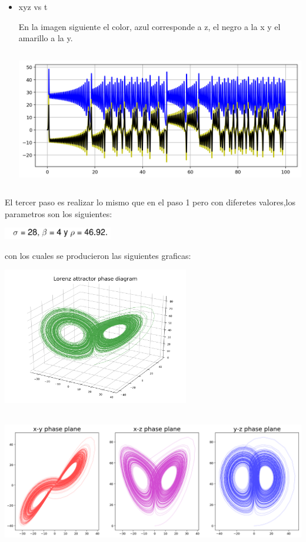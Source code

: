 \documentclass{article}
\begin{document}
\begin{itemize}
\item xyz vs t

En la imagen siguiente el color, azul corresponde a z, el negro a la x y el amarillo a la y.

\begin{center}
\includegraphics[height=6cm]{xyz_t.png}
\end{center}

\end{itemize}

\vspace{4cm}

El tercer paso es realizar lo mismo que en el paso 1 pero con diferetes valores,los parametros son los siguientes:

\begin{center}
\includegraphics[height=0.5cm]{cod2.PNG}
\end{center}


con los cuales se producieron las siguientes graficas:

\begin{center}
\includegraphics[height=6cm]{lorenz-attractor-3d-3.png}
\end{center}

\begin{center}
\includegraphics[height=6cm]{lorenz-attractor-phase-plane-3.png}
\end{center}
\end{document}

